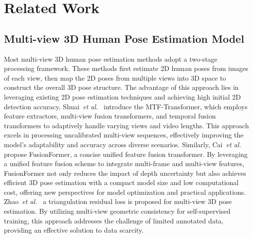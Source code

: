 \section{Related Work}
\subsection{Multi-view 3D Human Pose Estimation Model}
Most multi-view 3D human pose estimation methods adopt a two-stage processing framework. 
These methods first estimate 2D human poses from images of each view, then map the 2D poses from multiple views into 3D space to construct the overall 3D pose structure. 
The advantage of this approach lies in leveraging existing 2D pose estimation techniques and achieving high initial 2D detection accuracy. 
Shuai~\textit{et al.}~\cite{shuai2022adaptive} introduce the MTF-Transformer, which employs feature extractors, multi-view fusion transformers, and temporal fusion transformers to adaptively handle varying views and video lengths. 
This approach excels in processing uncalibrated multi-view sequences, effectively improving the model's adaptability and accuracy across diverse scenarios.
Similarly, Cai~\textit{et al.}~\cite{cai2024fusionformer} propose FusionFormer, a concise unified feature fusion transformer. 
By leveraging a unified feature fusion scheme to integrate multi-frame and multi-view features, FusionFormer not only reduces the impact of depth uncertainty but also achieves efficient 3D pose estimation with a compact model size and low computational cost, offering new perspectives for model optimization and practical applications. 
Zhao~\textit{et al.}~\cite{zhao2023triangulation} a triangulation residual loss is proposed for multi-view 3D pose estimation. 
By utilizing multi-view geometric consistency for self-supervised training, this approach addresses the challenge of limited annotated data, providing an effective solution to data scarcity.

